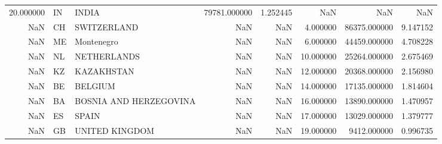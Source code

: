 \begin{tabular}{rllrrrrr}
20.000000 & IN & INDIA & 79781.000000 & 1.252445 & NaN & NaN & NaN \\
NaN & CH & SWITZERLAND & NaN & NaN & 4.000000 & 86375.000000 & 9.147152 \\
NaN & ME & Montenegro & NaN & NaN & 6.000000 & 44459.000000 & 4.708228 \\
NaN & NL & NETHERLANDS & NaN & NaN & 10.000000 & 25264.000000 & 2.675469 \\
NaN & KZ & KAZAKHSTAN & NaN & NaN & 12.000000 & 20368.000000 & 2.156980 \\
NaN & BE & BELGIUM & NaN & NaN & 14.000000 & 17135.000000 & 1.814604 \\
NaN & BA & BOSNIA AND HERZEGOVINA & NaN & NaN & 16.000000 & 13890.000000 & 1.470957 \\
NaN & ES & SPAIN & NaN & NaN & 17.000000 & 13029.000000 & 1.379777 \\
NaN & GB & UNITED KINGDOM & NaN & NaN & 19.000000 & 9412.000000 & 0.996735 \\
\bottomrule
\end{tabular}
